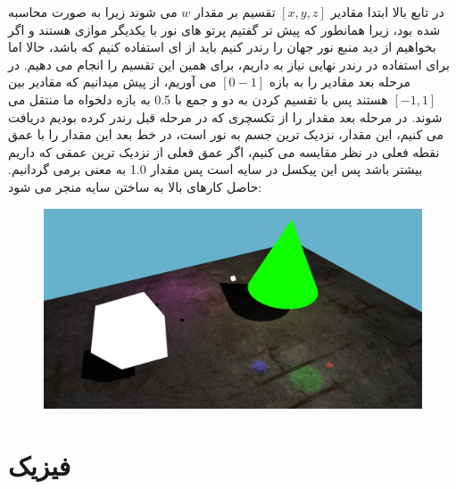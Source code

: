 \documentclass[a4paper, 12pt]{book}
\begin{document}
     در تابع بالا ابتدا مقادیر
     $[x, y, z]$
     تقسیم بر مقدار
     $w$
     می شوند زیرا  به صورت  محاسبه شده بود، زیرا همانطور که پیش تر گفتیم پرتو های نور با یکدیگر موازی هستند و اگر بخواهیم از دید منبع نور جهان را رندر کنیم باید از  ای استفاده کنیم که  باشد، حالا اما برای استفاده در رندر نهایی نیاز به  داریم، برای همین این تقسیم را انجام می دهیم. در مرحله بعد مقادیر را به بازه 
     $[0-1]$
     می آوریم، از پیش میدانیم که مقادیر بین 
     $[-1, 1]$
     هستند پس با تقسیم کردن به دو و جمع با 0.5 به بازه دلخواه ما منتقل می شوند. در مرحله بعد مقدار  را از تکسچری که در مرحله قبل رندر کرده بودیم دریافت می کنیم، این مقدار، نزدیک ترین جسم به نور است، در خط بعد این مقدار را با عمق نقطه فعلی در نظر مقایسه می کنیم، اگر عمق فعلی از نزدیک ترین عمقی که داریم بیشتر باشد پس این پیکسل در سایه است پس مقدار 1.0 به معنی  برمی گردانیم. حاصل کارهای بالا به ساختن سایه منجر می شود:
     
\begin{figure}[H]
    \centering
    \href{https://github.com/devprofile98/shm}{
        \includegraphics[width=13cm]{images/sceme-shadow.png}
    }
    \caption{}
    \label{fig:my_label}
\end{figure}

\part{فیزیک}
\begin{center}
    \chapter{}
\end{center}
\section{}
\section{}
\end{document}
